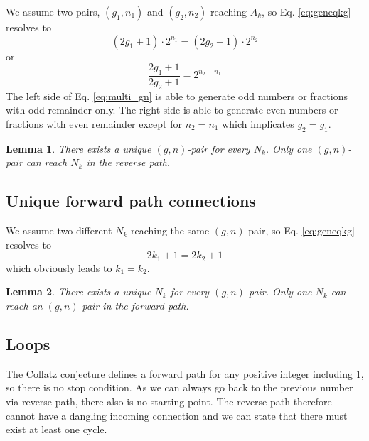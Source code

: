 \documentclass[10pt,a4paper]{article}
\newtheorem{lemma}{Lemma}
\begin{document}
We assume two pairs, $(g_1,n_1)$ and $(g_2,n_2)$ reaching $A_k$, so Eq. \ref{eq:geneqkg} resolves to
\begin{equation}
	(2g_1+1)\cdot2^{n_1}=(2g_2+1)\cdot2^{n_2}
\end{equation}
or
\begin{equation}
	\frac{2g_1+1}{2g_2+1}=2^{n_2-n_1}
\label{eq:multi_gn}
\end{equation}
The left side of Eq. \ref{eq:multi_gn} is able to generate odd numbers or fractions with odd remainder only. The right side is able to generate even numbers or fractions with even remainder except for $n_2=n_1$ which implicates $g_2=g_1$.
\begin{lemma}
There exists a unique $(g,n)$-pair for every $N_k$. Only one $(g,n)$-pair can reach $N_k$ in the reverse path.
\label{lemma:uniquepair_rev}
\end{lemma}

\subsection{Unique forward path connections}
We assume two different $N_k$ reaching the same $(g,n)$-pair, so Eq. \ref{eq:geneqkg} resolves to
\begin{equation}
	2k_1+1=2k_2+1
\label{eq:multi_k}
\end{equation}
which obviously leads to $k_1=k_2$.
\begin{lemma}
There exists a unique $N_k$ for every $(g,n)$-pair. Only one $N_k$ can reach an $(g,n)$-pair in the forward path.
\label{lemma:uniquepair_fwd}
\end{lemma}

\subsection{Loops}
The Collatz conjecture defines a forward path for any positive integer including $1$, so there is no stop condition. As we can always go back to the previous number via reverse path, there also is no starting point. The reverse path therefore cannot have a dangling incoming connection and we can state that there must exist at least one cycle.
\end{document}
